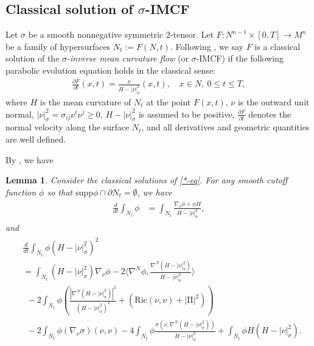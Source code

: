 \documentclass[11pt,letterpaper]{amsart}
\newtheorem{lem}[thm]{Lemma}
\theoremstyle{definition}
\theoremstyle{remark}
\begin{document}
\subsection{Classical solution of $\sigma $-IMCF}
Let $\sigma $ be a smooth nonnegative symmetric $2$-tensor.  Let $F: N^{n-1} \times [0, T] \to M^{n}$ be a family of hypersurfaces $N_t:= F(N, t)$. Following \cite{Dong26SigmaIMCF}, we say $F$ is a classical solution of the \textit{$\sigma $-inverse mean curvature flow} (or $\sigma $-IMCF) if the following parabolic evolution equation holds in the classical sense:
\begin{align}\label{*-eq}
	\frac{\partial F}{\partial t}(x,t) = \frac{\nu }{H- |\nu |^2_{\sigma }}(x,t),\quad x \in N,\ 0 \leq t \leq T, \tag*{$(*)$}
\end{align} 
where $H$ is the mean curvature of $N_t$ at the point $F(x, t)$, $\nu $ is the outward unit normal, $|\nu |^2_{\sigma }= \sigma _{ij} \nu ^{i} \nu ^{j} \geq 0$, $H-|\nu |^2_{\sigma }$ is assumed to be positive, $\frac{\partial F}{\partial t}$ denotes the normal velocity along the surface $N_t$, and all derivatives and geometric quantities are well defined. 

By \cite[Section 3]{Dong26SigmaIMCF}, we have
\begin{lem}\label{evolution-eq-classical}
Consider the classical solutions of \ref{*-eq}. For any smooth cutoff function $\phi $ so that $\mathrm{supp} \phi \cap \partial N_{t} = \emptyset$, we have
\begin{align}\label{ddt-phi-area}
	\begin{split}
		\frac{d}{d t} \int_{N_t} \phi &= \int_{N_t} \frac{\nabla _{\nu } \phi + \phi H}{H-|\nu |^2_{\sigma }},
	\end{split}
\end{align}
and
 \begin{align}\label{dt-int-H-nu}
	\begin{split}
		&\frac{d}{d t} \int_{N_t} \phi (H- |\nu |^2_{\sigma })^2 \\
									&= \int_{N_t} (H-|\nu |^2_{\sigma }) \nabla _{\nu }\phi -2 \langle \nabla ^{N} \phi , \frac{\nabla ^{N}(H-|\nu |^2_{\sigma })}{H- |\nu |^2_{\sigma }} \rangle \\
									&\ \ - 2 \int_{N_t}\phi \left(   \frac{|\nabla ^{N} (H-|\nu |^2_{\sigma })|^2}{(H-|\nu |^2_{\sigma })^2} + \left( \mathrm{Ric}(\nu ,\nu ) +|\mathrm{II}|^2 \right) \right) \\
									&\ \ -2 \int_{N_t} \phi (\nabla _{\nu } \sigma) (\nu , \nu ) - 4 \int_{N_t} \phi \frac{\sigma ( \nu , \nabla ^{N}(H- |\nu |^2_{\sigma }) )}{H- |\nu |^2_{\sigma }} + \int_{N_t}\phi H(H-|\nu |^2_{\sigma }).
	\end{split}
\end{align}

\end{lem}
\end{document}
